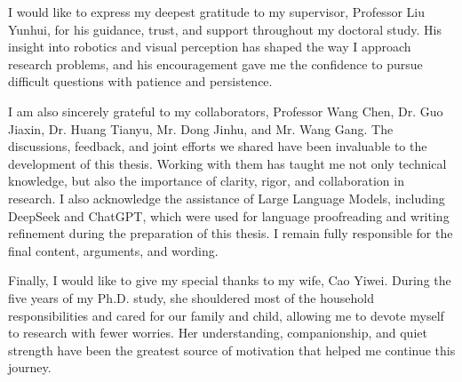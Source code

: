 \documentclass[11pt]{gsasthesis} %
\begin{document}
\renewcommand{\contentsname}{\protect\centering\protect\Large Contents}
\renewcommand{\listtablename}{\protect\centering\protect\Large List of Tables}
\renewcommand{\listfigurename}{\protect\centering\protect\Large List of Figures}

\tableofcontents %

\listoftables
\listoffigures
\begin{acknowledgments}
I would like to express my deepest gratitude to my supervisor, Professor Liu Yunhui, for his guidance, trust, and support throughout my doctoral study.
His insight into robotics and visual perception has shaped the way I approach research problems, and his encouragement gave me the confidence to pursue difficult questions with patience and persistence.

I am also sincerely grateful to my collaborators, Professor Wang Chen, Dr. Guo Jiaxin, Dr. Huang Tianyu, Mr. Dong Jinhu, and Mr. Wang Gang.
The discussions, feedback, and joint efforts we shared have been invaluable to the development of this thesis.
Working with them has taught me not only technical knowledge, but also the importance of clarity, rigor, and collaboration in research.
I also acknowledge the assistance of Large Language Models, including DeepSeek and ChatGPT, which were used for language proofreading and writing refinement during the preparation of this thesis.
I remain fully responsible for the final content, arguments, and wording.

Finally, I would like to give my special thanks to my wife, Cao Yiwei.
During the five years of my Ph.D. study, she shouldered most of the household responsibilities and cared for our family and child, allowing me to devote myself to research with fewer worries.
Her understanding, companionship, and quiet strength have been the greatest source of motivation that helped me continue this journey.
\end{acknowledgments}


\end{document}
